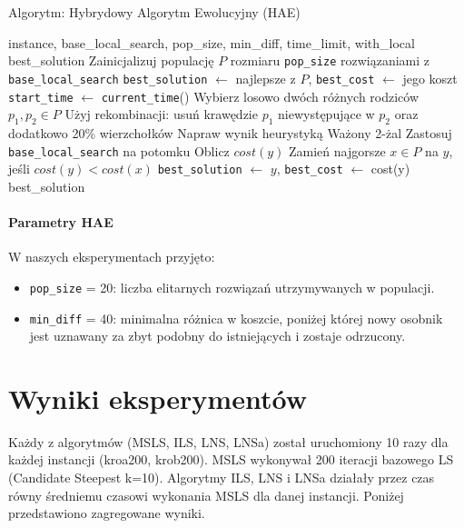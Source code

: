 \documentclass[12pt,a4paper]{article}
\begin{document}
\begin{algorithm}[H]
\caption{Algorytm: Hybrydowy Algorytm Ewolucyjny (HAE)}
\label{alg:hae}
\begin{algorithmic}[1]
\Require instance, base\_local\_search, pop\_size, min\_diff, time\_limit, with\_local
\Ensure best\_solution
\State Zainicjalizuj populację $P$ rozmiaru \texttt{pop\_size} rozwiązaniami z \texttt{base\_local\_search}
\State \texttt{best\_solution} $\leftarrow$ najlepsze z $P$, \texttt{best\_cost} $\leftarrow$ jego koszt
\State \texttt{start\_time} $\leftarrow$ \texttt{current\_time}()
    \State Wybierz losowo dwóch różnych rodziców $p_1, p_2 \in P$
    \State Użyj rekombinacji: usuń krawędzie $p_1$ niewystępujące w $p_2$ oraz dodatkowo 20\% wierzchołków
    \State Napraw wynik heurystyką Ważony 2-żal
      \State Zastosuj \texttt{base\_local\_search} na potomku
    \EndIf
    \State Oblicz $cost(y)$
      \State Zamień najgorsze $x\in P$ na $y$, jeśli $cost(y) < cost(x)$
        \State \texttt{best\_solution} $\leftarrow$ $y$, \texttt{best\_cost} $\leftarrow$ cost(y)
      \EndIf
    \EndIf
\EndWhile
\State \Return best\_solution
\end{algorithmic}
\end{algorithm}

\paragraph{Parametry HAE}
W naszych eksperymentach przyjęto:
\begin{itemize}
  \item \texttt{pop\_size} = 20: liczba elitarnych rozwiązań utrzymywanych w populacji.
  \item \texttt{min\_diff} = 40: minimalna różnica w koszcie, poniżej której nowy osobnik jest uznawany za zbyt podobny do istniejących i zostaje odrzucony.
\end{itemize}

\section{Wyniki eksperymentów}
Każdy z algorytmów (MSLS, ILS, LNS, LNSa) został uruchomiony 10 razy dla każdej instancji (kroa200, krob200). MSLS wykonywał 200 iteracji bazowego LS (Candidate Steepest k=10). Algorytmy ILS, LNS i LNSa działały przez czas równy średniemu czasowi wykonania MSLS dla danej instancji. Poniżej przedstawiono zagregowane wyniki.
\end{document}
